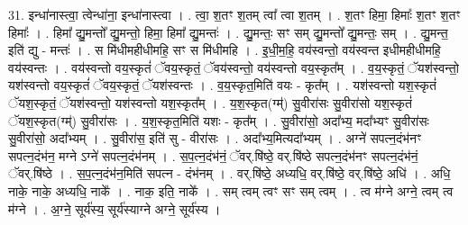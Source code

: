 \documentclass[17pt]{extarticle}
\begin{document}
31. इन्धा॑नास्त्वा॒ त्वेन्धा॑ना॒ इन्धा॑नास्त्वा । . त्वा॒ श॒तꣳ श॒तम् त्वा᳚ त्वा श॒तम् । . श॒तꣳ हिमा॒ हिमाः᳚ श॒तꣳ श॒तꣳ हिमाः᳚ । . हिमा᳚ द्यु॒मन्तो᳚ द्यु॒मन्तो॒ हिमा॒ हिमा᳚ द्यु॒मन्तः॑ । . द्यु॒मन्तः॒ सꣳ सम् द्यु॒मन्तो᳚ द्यु॒मन्तः॒ सम् । . द्यु॒मन्त॒ इति॑ द्यु - मन्तः॑ । . स मि॑धीमहीधीमहि॒ सꣳ स मि॑धीमहि । . इ॒धी॒म॒हि॒ वय॑स्वन्तो॒ वय॑स्वन्त इधीमहीधीमहि॒ वय॑स्वन्तः । . वय॑स्वन्तो वय॒स्कृतं॑ ॅवय॒स्कृतं॒ ॅवय॑स्वन्तो॒ वय॑स्वन्तो वय॒स्कृत᳚म् । . व॒य॒स्कृतं॒ ॅयश॑स्वन्तो॒ यश॑स्वन्तो वय॒स्कृतं॑ ॅवय॒स्कृतं॒ ॅयश॑स्वन्तः । . व॒य॒स्कृत॒मिति॑ वयः - कृत᳚म् । . यश॑स्वन्तो यश॒स्कृतं॑ ॅयश॒स्कृतं॒ ॅयश॑स्वन्तो॒ यश॑स्वन्तो यश॒स्कृत᳚म् । . य॒श॒स्कृत(ग्म्॑) सु॒वीरा॑सः सु॒वीरा॑सो यश॒स्कृतं॑ ॅयश॒स्कृत(ग्म्॑) सु॒वीरा॑सः । . य॒श॒स्कृत॒मिति॑ यशः - कृत᳚म् । . सु॒वीरा॑सो॒ अदा᳚भ्य॒ मदा᳚भ्यꣳ सु॒वीरा॑सः सु॒वीरा॑सो॒ अदा᳚भ्यम् । . सु॒वीरा॑स॒ इति॑ सु - वीरा॑सः । . अदा᳚भ्य॒मित्यदा᳚भ्यम् । . अग्ने॑ सपत्न॒दंभ॑नꣳ सपत्न॒दंभ॑न॒ मग्ने ऽग्ने॑ सपत्न॒दंभ॑नम् । . स॒प॒त्न॒दंभ॑नं॒ ॅवर्.षि॑ष्ठे॒ वर्.षि॑ष्ठे सपत्न॒दंभ॑नꣳ सपत्न॒दंभ॑नं॒ ॅवर्.षि॑ष्ठे । . स॒प॒त्न॒दंभ॑न॒मिति॑ सपत्न - दंभ॑नम् । . वर्.षि॑ष्ठे॒ अध्यधि॒ वर्.षि॑ष्ठे॒ वर्.षि॑ष्ठे॒ अधि॑ । . अधि॒ नाके॒ नाके॒ अध्यधि॒ नाके᳚ । . नाक॒ इति॒ नाके᳚ । . सम् त्वम् त्वꣳ सꣳ सम् त्वम् । . त्व म॑ग्ने अग्ने॒ त्वम् त्व म॑ग्ने । . अ॒ग्ने॒ सूर्य॑स्य॒ सूर्य॑स्याग्ने अग्ने॒ सूर्य॑स्य । \newline
\end{document}
